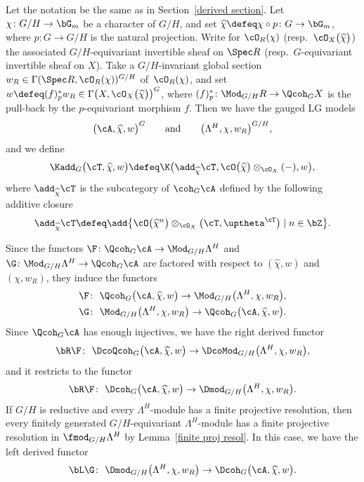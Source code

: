 Let the notation be the same as in Section~\ref{derived section}.
Let $\chi\colon G/H\to \bG_m$ be a character of $G/H$, and set $\widehat{\chi}\defeq\chi\circ p\colon G\to \bG_m$, where $p\colon G\to G/H$ is the natural projection. Write for $\cO_R(\chi)$ (resp.\ $\cO_X\big(\widehat{\chi}\big)$) the associated $G/H$-equivariant invertible sheaf on $\Spec R$ (resp.\ $G$-equivariant invertible sheaf on $X$). Take a $G/H$-invariant global section $w_R\in \Gamma(\Spec R,\cO_R(\chi))^{G/H}$ of~$\cO_R(\chi)$, and set $w\defeq (f)^*_{p}w_R\in \Gamma\big(X,\cO_X\big(\widehat{\chi}\big)\big)^G$, where $(f)^*_{p}\colon \Mod_{G/H}R\to \Qcoh_GX$ is the pull-back by the $p$-equivariant morphism $f$.
Then we have the gauged LG models
\begin{gather*}
\big(\cA,\widehat{\chi},w\big)^G \qquad \text{and}\qquad \big(\Lambda^H,\chi,w_R\big)^{G/H},
\end{gather*}
and we define
\begin{gather*}
\Kadd_G\big(\cT,\widehat{\chi},w\big)\defeq \K\big(\add_{\widehat{\chi}}\cT,\cO\big(\widehat{\chi}\big)\otimes_{\cO_X}(-),w\big),
\end{gather*}
where $\add_{\widehat{\chi}}\cT$ is the subcategory of $\coh_G\cA$ defined by the following additive closure
\begin{gather*}
\add_{\widehat{\chi}}\cT\defeq\add\big\{\cO\big(\widehat{\chi}^n\big)\otimes_{\cO_X} \big(\cT,\uptheta^{\cT}\big)\mid n\in \bZ \big\}.
\end{gather*}


Since the functors $\F\colon \Qcoh_{G}\cA\to \Mod_{G/H}\Lambda^H$ and $\G\colon \Mod_{G/H}\Lambda^H\to \Qcoh_{G}\cA$ are factored with respect to $(\widehat{\chi},w)$ and $(\chi,w_R)$, they induce the functors
\begin{gather*}
\F\colon\ \Qcoh_G\big(\cA,\widehat{\chi},w\big)\to\Mod_{G/H}\big(\Lambda^H,\chi,w_R\big),
\\
\G\colon\ \Mod_{G/H}\big(\Lambda^H,\chi,w_R\big)\to \Qcoh_G\big(\cA,\widehat{\chi},w\big).
\end{gather*}
Since $\Qcoh_G\cA$ has enough injectives, we have the right derived functor
\begin{gather*}
\bR\F\colon\ \DcoQcoh_G\big(\cA,\widehat{\chi},w\big)\to\DcoMod_{G/H}\big(\Lambda^H,\chi,w_R\big),
\end{gather*}
and it restricts to the functor
\begin{gather*}
\bR\F\colon\ \Dcoh_G\big(\cA,\widehat{\chi},w\big)\to\Dmod_{G/H}\big(\Lambda^H,\chi,w_R\big).
\end{gather*}
If $G/H$ is reductive and every $\Lambda^H$-module has a finite projective resolution, then every finitely generated $G/H$-equivariant $\Lambda^H$-module has a finite projective resolution in $\fmod_{G/H}\Lambda^H$ by Lemma~\ref{finite proj resol}. In this case, we have the left derived functor
\begin{gather*}
\bL\G\colon\ \Dmod_{G/H}\big(\Lambda^H,\chi,w_R\big)\to \Dcoh_{G}\big(\cA,\widehat{\chi},w\big).
\end{gather*}

